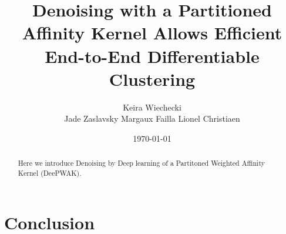 \documentclass{article}
\date{\today}
\title{Denoising with a Partitioned Affinity Kernel Allows Efficient End-to-End Differentiable Clustering}
\author{
  Keira Wiechecki \\
  \And
  Jade Zaslavsky
  \And
  Margaux Failla
  \And
  Lionel Christiaen \\
}
\begin{document}
\maketitle

\begin{abstract}
Here we introduce Denoising by Deep learning of a Partitoned Weighted Affinity Kernel (DeePWAK). 
\end{abstract}











\section{Conclusion}

\printbibliography
\end{document}
